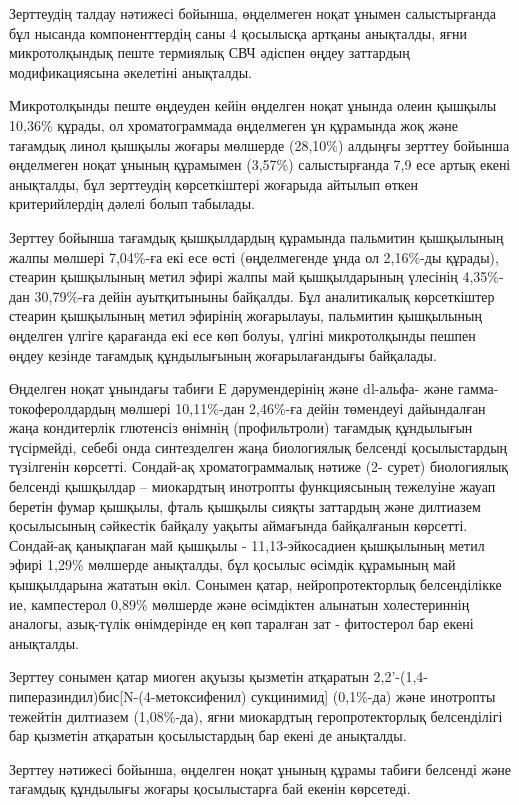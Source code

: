 Зерттеудің талдау нәтижесі бойынша, өңделмеген ноқат ұнымен
салыстырғанда бұл нысанда компоненттердің саны 4 қосылысқа артқаны
анықталды, яғни микротолқындық пеште термиялық СВЧ әдіспен өңдеу
заттардың модификациясына әкелетіні анықталды.

Микротолқынды пеште өңдеуден кейін өңделген ноқат ұнында олеин қышқылы
10,36\% құрады, ол хроматограммада өңделмеген ұн құрамында жоқ және
тағамдық линол қышқылы жоғары мөлшерде (28,10\%) алдыңғы зерттеу бойынша
өңделмеген ноқат ұнының құрамымен (3,57\%) салыстырғанда 7,9 есе артық
екені анықталды, бұл зерттеудің көрсеткіштері жоғарыда айтылып өткен
критерийлердің дәлелі болып табылады.

Зерттеу бойынша тағамдық қышқылдардың құрамында пальмитин қышқылының
жалпы мөлшері 7,04\%-ға екі есе өсті (өңделмегенде ұнда ол 2,16\%-ды
құрады), стеарин қышқылының метил эфирі жалпы май қышқылдарының үлесінің
4,35\%-дан 30,79\%-ға дейін ауытқитыныны байқалды. Бұл аналитикалық
көрсеткіштер стеарин қышқылының метил эфирінің жоғарылауы, пальмитин
қышқылының өңделген үлгіге қарағанда екі есе көп болуы, үлгіні
микротолқынды пешпен өңдеу кезінде тағамдық құндылығының жоғарылағандығы
байқалады.

Өңделген ноқат ұнындағы табиғи Е дәрумендерінің және dl-альфа- және
гамма-токоферолдардың мөлшері 10,11\%-дан 2,46\%-ға дейін төмендеуі
дайындалған жаңа кондитерлік глютенсіз өнімнің (профильтроли) тағамдық
құндылығын түсірмейді, себебі онда синтезделген жаңа биологиялық
белсенді қосылыстардың түзілгенін көрсетті. Сондай-ақ хроматограммалық
нәтиже (2- сурет) биологиялық белсенді қышқылдар -- миокардтың инотропты
функциясының тежелуіне жауап беретін фумар қышқылы, фталь қышқылы сияқты
заттардың және дилтиазем қосылысының сәйкестік байқалу уақыты аймағында
байқалғанын көрсетті. Сондай-ақ қанықпаған май қышқылы -
11,13-эйкосадиен қышқылының метил эфирі 1,29\% мөлшерде анықталды, бұл
қосылыс өсімдік құрамының май қышқылдарына жататын өкіл. Сонымен қатар,
нейропротекторлық белсенділікке ие, кампестерол 0,89\% мөлшерде және
өсімдіктен алынатын холестериннің аналогы, азық-түлік өнімдерінде ең көп
таралған зат - фитостерол бар екені анықталды.

Зерттеу сонымен қатар миоген ақуызы қызметін атқаратын
2,2'-(1,4-пиперазиндил)бис{[}N-(4-метоксифенил)
сукцинимид{]} (0,1\%-да) және инотропты тежейтін дилтиазем (1,08\%-да),
яғни миокардтың геропротекторлық белсенділігі бар қызметін атқаратын
қосылыстардың бар екені де анықталды.

Зерттеу нәтижесі бойынша, өңделген ноқат ұнының құрамы табиғи белсенді
және тағамдық құндылығы жоғары қосылыстарға бай екенін көрсетеді.

